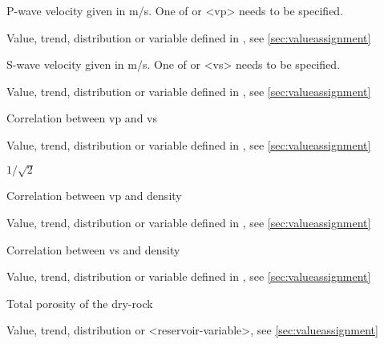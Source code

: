 {
 \slist
   \item \Description P-wave velocity given in m/s. One of  or <vp> needs to be specified.
   \item \Argument Value, trend, distribution or variable defined in , see \autoref{sec:valueassignment}
   \item \Default
 \elist

 \slist
   \item \Description S-wave velocity given in m/s. One of  or <vs> needs to be specified.
   \item \Argument Value, trend, distribution or variable defined in , see \autoref{sec:valueassignment}
   \item \Default
 \elist

 \slist
   \item \Description Correlation between vp and vs
   \item \Argument Value, trend, distribution or variable defined in , see \autoref{sec:valueassignment}
   \item \Default $1/\sqrt{2}$
 \elist

 \slist
   \item \Description Correlation between vp and density
   \item \Argument Value, trend, distribution or variable defined in , see \autoref{sec:valueassignment}
   \item {}
 \elist

 \slist
   \item \Description Correlation between vs and density
   \item \Argument Value, trend, distribution or variable defined in , see \autoref{sec:valueassignment}
   \item {}
 \elist

 \slist
   \item \Description Total porosity of the dry-rock
   \item \Argument Value, trend, distribution or <reservoir-variable>, see \autoref{sec:valueassignment}
   \item \Default
 \elist

}
